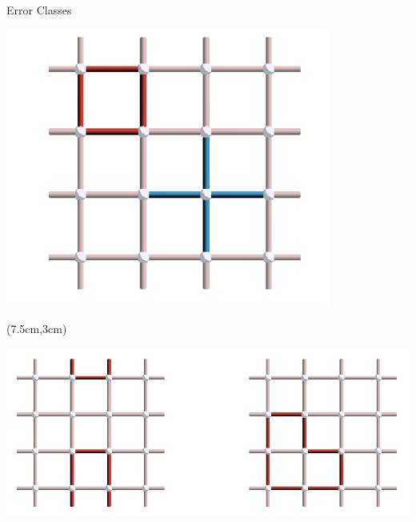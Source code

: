 \documentclass{dfki}
\begin{document}
\begin{frame}{Error Classes}
{\begin{textblock*}{6cm}
\begin{center}
				\includegraphics[width=0.8\textwidth]{fig/BU_equivalenceClass_2.png}
			\end{center}
		\end{textblock*}
		\begin{textblock*}{8cm}(7.5cm,3cm)
			\begin{center}
				\includegraphics[width=1\textwidth]{fig/BU_equivalenceClass_1.png}
			\end{center}
		\end{textblock*}
	}
\end{frame}
\end{document}
